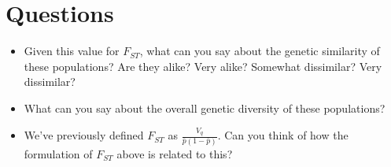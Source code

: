 \documentclass[12pt]{article}
\begin{document}
\section*{Questions}
\begin{itemize}
\item{Given this value for $F_{ST}$, what can you say about the genetic similarity of
these populations?  Are they alike?  Very alike?  Somewhat dissimilar?  Very
dissimilar?}
\item{What can you say about the overall genetic diversity of these
populations?}
\item{We've previously defined $F_{ST}$ as $\frac{V_q}{\bar{p}(1-\bar{p})}$. 
Can you
think of how the formulation of $F_{ST}$ above is related to this?}
\end{itemize}
\end{document}
